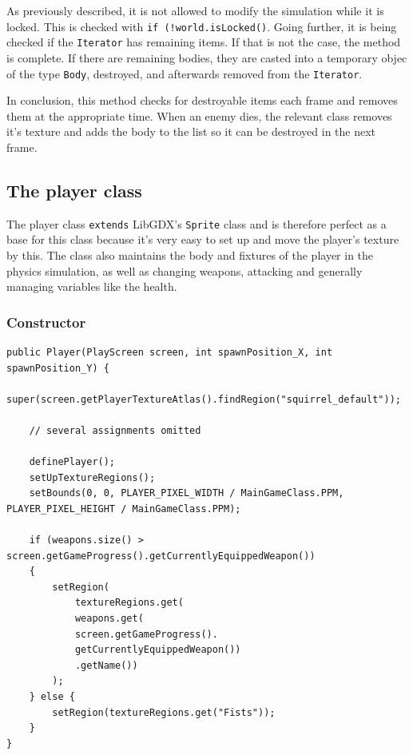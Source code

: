 \documentclass[12p]{article}
\begin{document}
As previously described, it is not allowed to modify the simulation while it is locked. This is checked with \texttt{if (!world.isLocked()}. Going further, it is being checked if the \texttt{Iterator} has remaining items. If that is not the case, the method is complete. If there are remaining bodies, they are casted into a temporary objec of the type \texttt{Body}, destroyed, and afterwards removed from the \texttt{Iterator}.

In conclusion, this method checks for destroyable items each frame and removes them at the appropriate time. When an enemy dies, the relevant class removes it's texture and adds the body to the list so it can be destroyed in the next frame.


\newpage
\subsection{The player class} \label{DocPlayerClass}

The player class \texttt{extends} LibGDX's \texttt{Sprite} class and is therefore perfect as a base for this class because it's very easy to set up and move the player's texture by this. The class also maintains the body and fixtures of the player in the physics simulation, as well as changing weapons, attacking and generally managing variables like the health.

\subsubsection{Constructor}

\begin{verbatim}
public Player(PlayScreen screen, int spawnPosition_X, int spawnPosition_Y) {
    super(screen.getPlayerTextureAtlas().findRegion("squirrel_default"));
    
    // several assignments omitted

    definePlayer();
    setUpTextureRegions();
    setBounds(0, 0, PLAYER_PIXEL_WIDTH / MainGameClass.PPM, PLAYER_PIXEL_HEIGHT / MainGameClass.PPM);

    if (weapons.size() > screen.getGameProgress().getCurrentlyEquippedWeapon()) 
    {
        setRegion(
            textureRegions.get(
            weapons.get(
            screen.getGameProgress().
            getCurrentlyEquippedWeapon())
            .getName())
        );
    } else {
        setRegion(textureRegions.get("Fists"));
    }
}
\end{verbatim}
\end{document}
